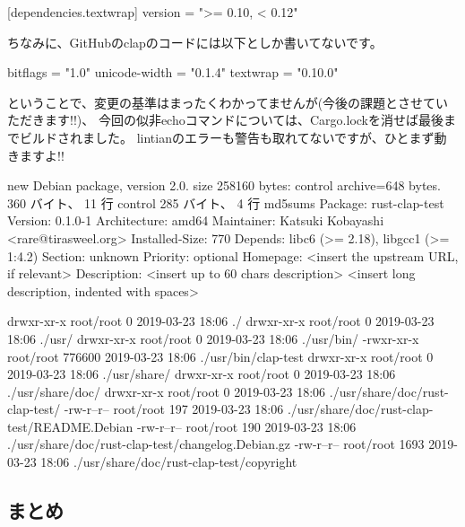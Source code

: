 \documentclass[mingoth,a4paper]{jsarticle}
\begin{document}
\begin{commandline}
[dependencies.textwrap]
version = ">= 0.10, < 0.12"
\end{commandline}

ちなみに、GitHubのclapのコードには以下としか書いてないです。

\begin{commandline}
[dependencies]
bitflags              = "1.0"
unicode-width         = "0.1.4"
textwrap              = "0.10.0"
\end{commandline}

ということで、変更の基準はまったくわかってませんが(今後の課題とさせていただきます!!)、
今回の似非echoコマンドについては、Cargo.lockを消せば最後までビルドされました。
lintianのエラーも警告も取れてないですが、ひとまず動きますよ!!

\begin{commandline}
new Debian package, version 2.0.
size 258160 bytes: control archive=648 bytes.
360 バイト、   11 行      control
285 バイト、    4 行      md5sums
Package: rust-clap-test
Version: 0.1.0-1
Architecture: amd64
Maintainer: Katsuki Kobayashi <rare@tirasweel.org>
Installed-Size: 770
Depends: libc6 (>= 2.18), libgcc1 (>= 1:4.2)
Section: unknown
Priority: optional
Homepage: <insert the upstream URL, if relevant>
Description: <insert up to 60 chars description>
<insert long description, indented with spaces>

drwxr-xr-x root/root         0 2019-03-23 18:06 ./
drwxr-xr-x root/root         0 2019-03-23 18:06 ./usr/
drwxr-xr-x root/root         0 2019-03-23 18:06 ./usr/bin/
-rwxr-xr-x root/root    776600 2019-03-23 18:06 ./usr/bin/clap-test
drwxr-xr-x root/root         0 2019-03-23 18:06 ./usr/share/
drwxr-xr-x root/root         0 2019-03-23 18:06 ./usr/share/doc/
drwxr-xr-x root/root         0 2019-03-23 18:06 ./usr/share/doc/rust-clap-test/
-rw-r--r-- root/root       197 2019-03-23 18:06 ./usr/share/doc/rust-clap-test/README.Debian
-rw-r--r-- root/root       190 2019-03-23 18:06 ./usr/share/doc/rust-clap-test/changelog.Debian.gz
-rw-r--r-- root/root      1693 2019-03-23 18:06 ./usr/share/doc/rust-clap-test/copyright
\end{commandline}

\subsection{まとめ}
\end{document}
